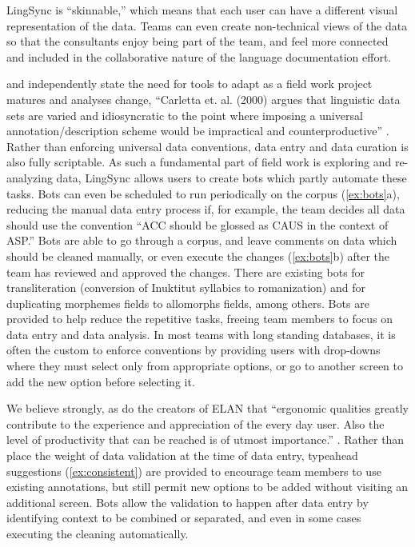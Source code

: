 \documentclass[letterpaper, 12pt, dvips]{mitwpl}
\begin{document}
LingSync is ``skinnable,''
which means that each user can have a different visual representation of the data.
Teams can even create non-technical views of the data so that the consultants enjoy being part of the team, and feel more connected and included in  the collaborative nature of the language documentation effort.


\cite{Palmer:2009} and \cite{Cihlar:2008} independently state the need for tools to adapt as a field work project matures and analyses change, 
``Carletta et. al. (2000) argues that linguistic data sets are varied and idiosyncratic to the point where imposing a universal annotation/description scheme would be impractical and counterproductive''   \cite[p.11]{Cihlar:2008}.
Rather than enforcing universal data conventions, 
data entry and data curation is also fully scriptable.
As such a fundamental part of field work is exploring and re-analyzing data,
LingSync allows users to create bots which partly automate these tasks.
Bots can even be scheduled to run periodically on the corpus (\ref{ex:bots}a),
reducing the manual data entry process if,
for example,
the team decides all data should use the convention ``ACC should be glossed as CAUS in the context of ASP.'' Bots are able to go through a corpus,
and leave comments on data which should be cleaned manually,
or even execute the changes (\ref{ex:bots}b) after the team has reviewed and approved the changes.
There are existing bots for transliteration (conversion of Inuktitut syllabics to romanization) and for duplicating morphemes fields to allomorphs fields,
among others.
Bots are provided to help reduce the repetitive tasks,
freeing team members to focus on data entry and data analysis.
In most teams with long standing databases,
it is often the custom to enforce conventions by providing users with drop-downs where they must select only from appropriate options,
or go to another screen to add the new option before selecting it.

We believe strongly, as do the creators of  ELAN that ``ergonomic qualities greatly contribute to the experience and appreciation of the every day user. Also the level of productivity that can be reached is of utmost importance.'' \citep[p.1559]{Wittenburg:2006}.
Rather than place the weight of data validation at the time of data entry, typeahead suggestions (\ref{ex:consistent}) are provided to encourage team members to use existing annotations, 
but still permit new options to be added without visiting an additional screen. 
Bots allow the validation to happen after data entry by identifying context to be combined or separated, and even in some cases executing the cleaning automatically.
\end{document}
